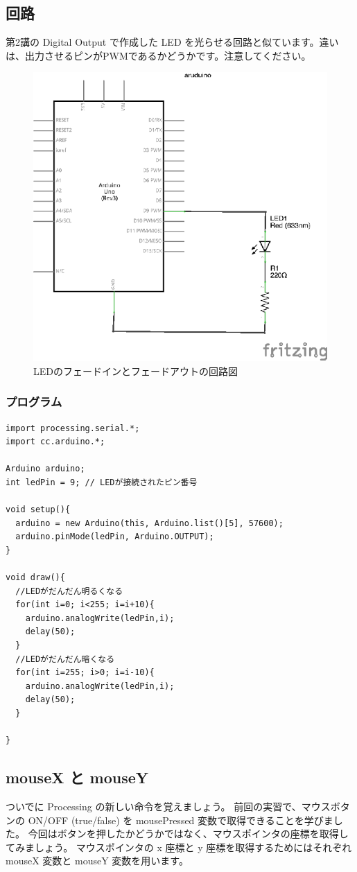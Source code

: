 \documentclass[11pt,a4paper]{jarticle}
\begin{document}
\subsection*{回路}
第2講の Digital Output で作成した LED を光らせる回路と似ています。違いは、出力させるピンがPWMであるかどうかです。注意してください。
\begin{figure}[h!]
 \centering
 \includegraphics[width=0.5\columnwidth]{img/LED_circuit.eps}
 \caption{LEDのフェードインとフェードアウトの回路図}
\end{figure}

\subsubsection*{プログラム}
\begin{lstlisting}
import processing.serial.*;
import cc.arduino.*;

Arduino arduino;
int ledPin = 9; // LEDが接続されたピン番号

void setup(){
  arduino = new Arduino(this, Arduino.list()[5], 57600);
  arduino.pinMode(ledPin, Arduino.OUTPUT);
}

void draw(){
  //LEDがだんだん明るくなる
  for(int i=0; i<255; i=i+10){
    arduino.analogWrite(ledPin,i);
    delay(50);
  }
  //LEDがだんだん暗くなる
  for(int i=255; i>0; i=i-10){
    arduino.analogWrite(ledPin,i);
    delay(50);
  }
  
}
\end{lstlisting}

\subsection*{mouseX と mouseY}
ついでに Processing の新しい命令を覚えましょう。
前回の実習で、マウスボタンの ON/OFF (true/false) を mousePressed 変数で取得できることを学びました。
今回はボタンを押したかどうかではなく、マウスポインタの座標を取得してみましょう。
マウスポインタの x 座標と y 座標を取得するためにはそれぞれ mouseX 変数と mouseY 変数を用います。
\end{document}
